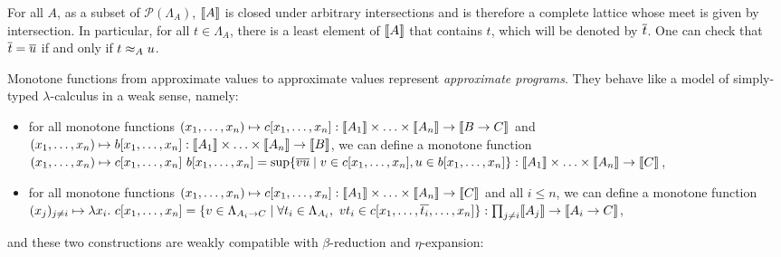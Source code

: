 For all $A$, as a subset of $\mathcal{P}(\Lambda_A)$, $\llbracket A \rrbracket$ is closed under arbitrary intersections and is therefore a complete lattice whose meet is given by intersection. In particular, for all $t\in\Lambda_A$, there is a least element of $\llbracket A \rrbracket$ that contains $t$, which will be denoted by $\overline{t}$. 
One can check that $\overline{t} = \overline{u}$ if and only if $t\approx_{A} u$.

Monotone functions from approximate values to approximate values represent \emph{approximate programs}. They behave like a model of simply-typed $\lambda$-calculus in a weak sense, namely: \begin{itemize}
\item for all monotone functions $(x_1, \ldots, x_n) \mapsto c[x_1, \ldots, x_n] : \llbracket A_1 \rrbracket \times \ldots \times \llbracket A_n \rrbracket \to \llbracket B \to C \rrbracket$ and $(x_1, \ldots, x_n) \mapsto b[x_1, \ldots, x_n] : \llbracket A_1 \rrbracket \times \ldots \times \llbracket A_n \rrbracket \to \llbracket B \rrbracket$, we can define a monotone function $(x_1, \ldots, x_n) \mapsto c[x_1, \ldots, x_n]~ b[x_1, \ldots, x_n] = \sup\{\overline{vu} \mid v \in c[x_1, \ldots, x_n], u \in b[x_1, \ldots, x_n]\} : \llbracket A_1 \rrbracket \times \ldots \times \llbracket A_n \rrbracket \to \llbracket C \rrbracket$,
\item for all monotone functions $(x_1, \ldots, x_n) \mapsto c[x_1, \ldots, x_n] : \llbracket A_1 \rrbracket \times \ldots \times \llbracket A_n \rrbracket \to \llbracket C \rrbracket$ and all $i \leq n$, we can define a monotone function $(x_j)_{j \neq i} \mapsto \lambda x_i.~ c[x_1, \ldots, x_n] = \{ v \in \Lambda_{A_i \to C} \mid \forall t_i \in \Lambda_{A_i},~ v t_i \in c[x_1, \ldots, \overline{t_i}, \ldots, x_n] \} : \prod_{j \neq i} \llbracket A_j \rrbracket \to \llbracket A_i \to C \rrbracket$,
\end{itemize}
and these two constructions are weakly compatible with $\beta$-reduction and $\eta$-expansion:

